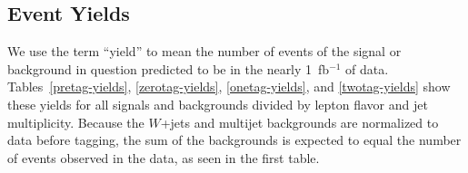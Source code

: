 \subsection{Event Yields}
\label{event-yields}

We use the term ``yield'' to mean the number of events of the signal
or background in question predicted to be in the nearly 1~fb$^{-1}$ of
data. Tables~\ref{pretag-yields}, \ref{zerotag-yields},
\ref{onetag-yields}, and \ref{twotag-yields} show these yields for all
signals and backgrounds divided by lepton flavor and jet
multiplicity. Because the $W$+jets and multijet backgrounds are
normalized to data before tagging, the sum of the backgrounds is
expected to equal the number of events observed in the data, as seen
in the first table.

\vspace{0.2in}
